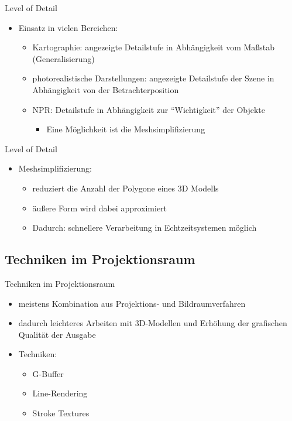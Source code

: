 \begin{frame}{Level of Detail}
  \begin{itemize}
    \item Einsatz in vielen Bereichen:
    \begin{itemize}
      \item Kartographie: angezeigte Detailstufe in Abhängigkeit vom
      Maßstab (Generalisierung)
      \item photorealistische Darstellungen: angezeigte Detailstufe der
      Szene in Abhängigkeit von der Betrachterposition
      \item NPR: Detailstufe in Abhängigkeit zur "`Wichtigkeit"' der
      Objekte
      \begin{itemize}
        \item Eine Möglichkeit ist die Meshsimplifizierung
      \end{itemize}
    \end{itemize}
  \end{itemize}
\end{frame}

\begin{frame}{Level of Detail}
  \begin{itemize}
    \item Meshsimplifizierung:
    \begin{itemize}
      \item reduziert die Anzahl der Polygone eines 3D Modells
      \item äußere Form wird dabei approximiert
      \item Dadurch: schnellere Verarbeitung in Echtzeitsystemen möglich
    \end{itemize}
  \end{itemize}
\end{frame}

\subsection{Techniken im Projektionsraum}
\begin{frame}{Techniken im Projektionsraum}
  \begin{itemize}
    \item meistens Kombination aus Projektions- und
    Bildraumverfahren
    \item dadurch leichteres Arbeiten mit 3D-Modellen und
    Erhöhung der grafischen Qualität der Ausgabe
    \item Techniken:
    \begin{itemize}
      \item G-Buffer
      \item Line-Rendering
      \item Stroke Textures
    \end{itemize}
  \end{itemize}
\end{frame}


